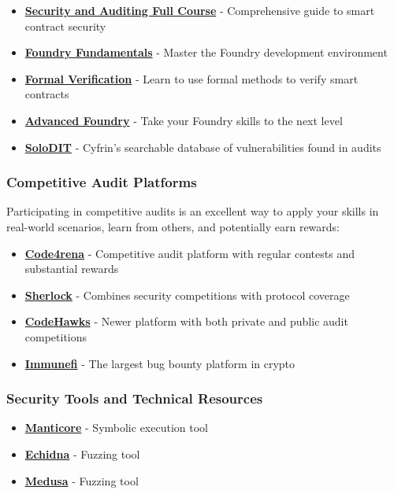 \documentclass[12pt]{article}
\begin{document}
\begin{itemize}
    \item \textbf{\href{https://updraft.cyfrin.io/courses/security}{Security and Auditing Full Course}} - Comprehensive guide to smart contract security
    \item \textbf{\href{https://updraft.cyfrin.io/courses/foundry}{Foundry Fundamentals}} - Master the Foundry development environment
    \item \textbf{\href{https://updraft.cyfrin.io/courses/formal-verification}{Formal Verification}} - Learn to use formal methods to verify smart contracts
    \item \textbf{\href{https://updraft.cyfrin.io/courses/advanced-foundry}{Advanced Foundry}} - Take your Foundry skills to the next level
    \item \textbf{\href{https://solodit.cyfrin.io/}{SoloDIT}} - Cyfrin's searchable database of vulnerabilities found in audits
\end{itemize}

\subsubsection*{Competitive Audit Platforms}

Participating in competitive audits is an excellent way to apply your skills in
real-world scenarios, learn from others, and potentially earn rewards:

\begin{itemize}
    \item \textbf{\href{https://code4rena.com/}{Code4rena}} - Competitive audit platform with regular contests and substantial rewards
    \item \textbf{\href{https://www.sherlock.xyz/}{Sherlock}} - Combines security competitions with protocol coverage
    \item \textbf{\href{https://codehawks.cyfrin.io/}{CodeHawks}} - Newer platform with both private and public audit competitions
    \item \textbf{\href{https://immunefi.com/}{Immunefi}} - The largest bug bounty platform in crypto
\end{itemize}

\subsubsection*{Security Tools and Technical Resources}

\begin{itemize}
    \item \textbf{\href{https://github.com/trailofbits/manticore}{Manticore}} - Symbolic execution tool
    \item \textbf{\href{https://github.com/crytic/echidna}{Echidna}} - Fuzzing tool
    \item \textbf{\href{https://github.com/crytic/medusa}{Medusa}} - Fuzzing tool
\end{itemize}
\end{document}
